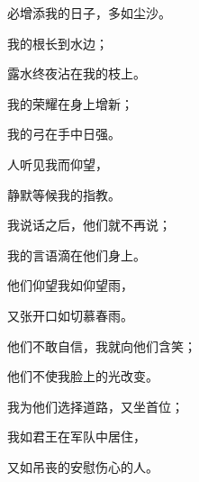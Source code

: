 {\par }{\Q 必增添我的日子，多如尘沙。
\par }{\Q {}我的根长到水边；
\par }{\Q 露水终夜沾在我的枝上。
\par }{\Q {}我的荣耀在身上增新；
\par }{\Q 我的弓在手中日强。
\par }{\BB \par }{\Q {}人听见我而仰望，
\par }{\Q 静默等候我的指教。
\par }{\Q {}我说话之后，他们就不再说；
\par }{\Q 我的言语{}滴在他们身上。
\par }{\Q {}他们仰望我如仰望雨，
\par }{\Q 又张开口如切慕春雨。
\par }{\Q {}他们不敢自信，我就向他们含笑；
\par }{\Q 他们不使我脸上的光改变。
\par }{\Q {}我为他们选择道路，又坐首位；
\par }{\Q 我如君王在军队中居住，
\par }{\Q 又如吊丧的安慰伤心的人。

}
